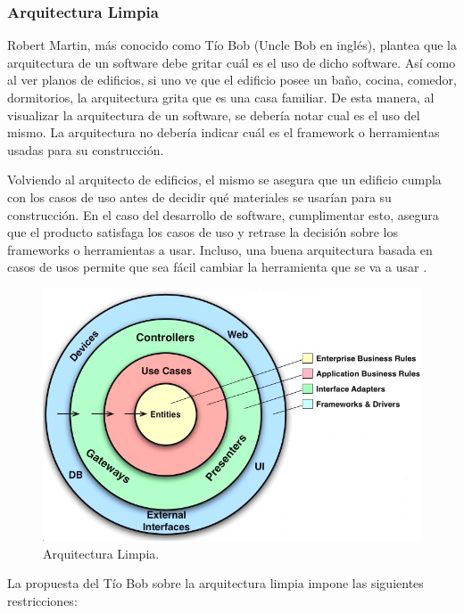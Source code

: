\subsubsection{\textbf{Arquitectura Limpia}}
Robert Martin, más conocido como Tío Bob (Uncle Bob en inglés), plantea que la arquitectura de un software debe gritar cuál es el uso de dicho software. Así como al ver planos de edificios, si uno ve que el edificio posee un baño, cocina, comedor, dormitorios, la arquitectura grita que es una casa familiar. De esta manera, al visualizar la arquitectura de un software, se debería notar cual es el uso del mismo. La arquitectura no debería indicar cuál es el framework o herramientas usadas para su construcción.

Volviendo al arquitecto de edificios, el mismo se asegura que un edificio cumpla con los casos de uso antes de decidir qué materiales se usarían para su construcción. En el caso del desarrollo de software, cumplimentar esto, asegura que el producto satisfaga los casos de uso y retrase la decisión sobre los frameworks o herramientas a usar. Incluso, una buena arquitectura basada en casos de usos permite que sea fácil cambiar la herramienta que se va a usar .

\begin{figure}[h]
\centering%
\includegraphics[width=0.8\linewidth]{contextualizacion/MarcoReferencial/imgs/clean_architecture.png}%
\caption{Arquitectura Limpia. \cite{clean-architecture_2018}} \label{fig:clean_architecture}
\end{figure}


La propuesta del Tío Bob sobre la arquitectura limpia impone las siguientes restricciones:\\

